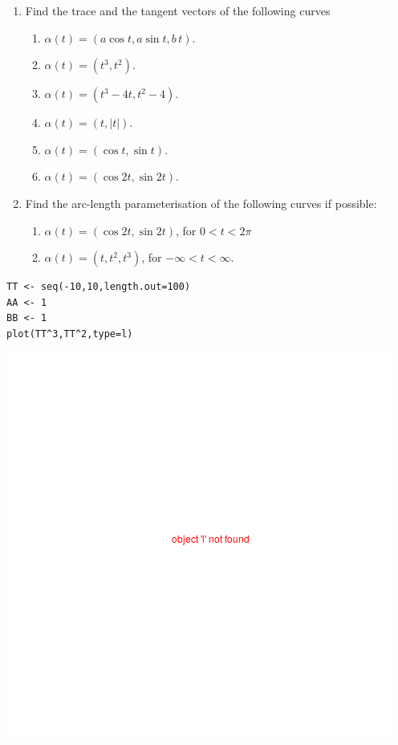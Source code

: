 \documentclass{amsart}
\begin{document}
\begin{enumerate}
\item Find the trace and the tangent vectors of the following curves
\begin{enumerate}
\item \(\alpha(t)  = (a \cos t, a \sin t, b\,t)\).
\item \(\alpha(t)  = ( t^3, t^2)\).
\item \(\alpha(t)  = (t^3 -4t, t^2 -4)\).
\item \(\alpha(t)  = (t, |t|)\).
\item \(\alpha(t)  = (\cos t, \sin t)\).
\item \(\alpha(t)  = (\cos 2t, \sin 2t)\).
\end{enumerate}

\item Find the arc-length parameterisation of the following curves if possible:

\begin{enumerate}
\item \(\alpha(t)  = (\cos 2t, \sin 2t)\), for \(0 < t < 2\pi\)

\item \(\alpha(t) = (t, t^2, t^3)\), for \(-\infty < t < \infty\).
\end{enumerate}
\end{enumerate}



\begin{verbatim}
TT <- seq(-10,10,length.out=100)
AA <- 1
BB <- 1
plot(TT^3,TT^2,type=l)
\end{verbatim}

\begin{center}
\includegraphics[width=.9\linewidth]{img.png}
\end{center}
\end{document}

